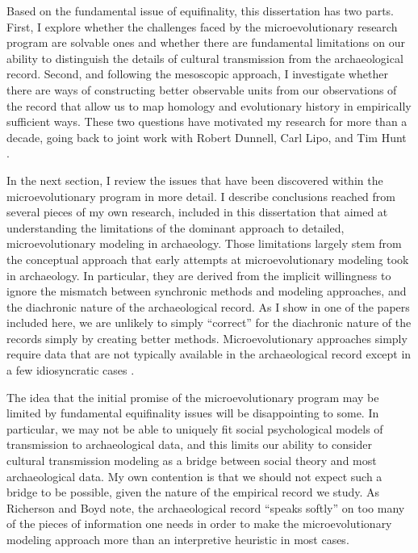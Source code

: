 Based on the fundamental issue of equifinality, this dissertation has two parts.  First, I explore whether the challenges faced by the microevolutionary research program are solvable ones and whether there are fundamental limitations on our ability to distinguish the details of cultural transmission from the archaeological record.  Second, and following the mesoscopic approach, I investigate whether there are ways of constructing better observable units from our observations of the record that allow us to map homology and evolutionary history in empirically sufficient ways. These two questions have motivated my research for more than a decade, going back to joint work with Robert Dunnell, Carl Lipo, and Tim Hunt \citep{Lipo1997,lipomadsen1997,lipomadsenhunt1995b}.  

In the next section, I review the issues that have been discovered within the microevolutionary program in more detail.  I describe conclusions reached from several pieces of my own research, included in this dissertation that aimed at understanding the limitations of the dominant approach to detailed, microevolutionary modeling in archaeology. Those limitations largely stem from the conceptual approach that early attempts at microevolutionary modeling took in archaeology.  In particular, they are derived from the implicit willingness to ignore the mismatch between synchronic methods and modeling approaches, and the diachronic nature of the archaeological record.  As I show in one of the papers included here, we are unlikely to simply ``correct'' for the diachronic nature of the records simply by creating better methods.  Microevolutionary approaches simply require data that are not typically available in the archaeological record except in a few idiosyncratic cases \citep{scholnick2010apprenticeship,Mallios2014}.

The idea that the initial promise of the microevolutionary program may be limited by fundamental equifinality issues will be disappointing to some.  In particular, we may not be able to uniquely fit social psychological models of transmission to archaeological data, and this limits our ability to consider cultural transmission modeling as a bridge between social theory and most archaeological data.  My own contention is that we should not expect such a bridge to be possible, given the nature of the empirical record we study.  As Richerson and Boyd \citeyearpar{richerson2008response} note, the archaeological record ``speaks softly'' on too many of the pieces of information one needs in order to make the microevolutionary modeling approach more than an interpretive heuristic in most cases. 

